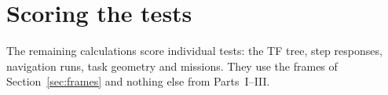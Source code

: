 \documentclass[11pt]{article}
\begin{document}



\clearpage
\part{Scoring the tests}
\label{part:scoring}
\noindent The remaining calculations score individual tests: the TF tree, step
responses, navigation runs, task geometry and missions. They use the frames of
Section~\ref{sec:frames} and nothing else from Parts~I--III.







\appendix


\end{document}

